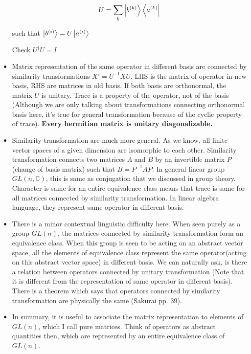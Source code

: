 \documentclass{report}
\begin{document}
\begin{itemize}
  $$U = \sum_{k} \ket{b^{(k)}}\bra{a^{(k)}}$$

  such that $\ket{b^{(i)}} = U\ket{a^{(i)}}$

  Check $U^\dag U = I$

\item Matrix representation of the same operator in different basis are connected by similarity transformations $X' =U^{-1}XU$. LHS is the matrix of operator in new basis, RHS are matrices in old basis. If both basis are orthonormal, the matrix $U$ is unitary. Trace is a property of the operator, not of the basis (Although we are only talking about transformations connecting orthonormal basis here, it's true for general transformation because of the cyclic property of trace). \textbf{Every hermitian matrix is unitary diagonalizable.}\\

\item Similarity transformation are much more general. As we know, all finite vector spaces of a given dimension are isomorphic to each other. Similarity transformation connects two matrices $A$ and $B$ by an invertible matrix $P$(change of basis matrix) such that $B = P^{-1}AP$. In general linear group $GL(n,\mathbb{C})$, this is same as conjugation that we discussed in group theory. Character is same for an entire equivalence class means that trace is same for all matrices connected by similarity transformation. In linear algebra language, they represent same operator in different basis.\\

\item There is a minor contextual linguistic difficulty here. When seen purely as a group $GL(n)$, the matrices connected by similarity transformation form an equivalence class. When this group is seen to be acting on an abstract vector space, all the elements of equivalence class represent the same operator(acting on this abstract vector space) in different basis. We can naturally ask, is there a relation between operators connected by unitary transformation (Note that it is different from the representation of same operator in different basis). There is a theorem which says that operators connected by similarity transformation are physically the same (Sakurai pp. 39).\\

\item In summary, it is useful to associate the matrix representation to elements of $GL(n)$, which I call pure matrices. Think of operators as abstract quantities then, which are represented by an entire equivalence class of $GL(n)$.


\end{itemize}
\end{document}
